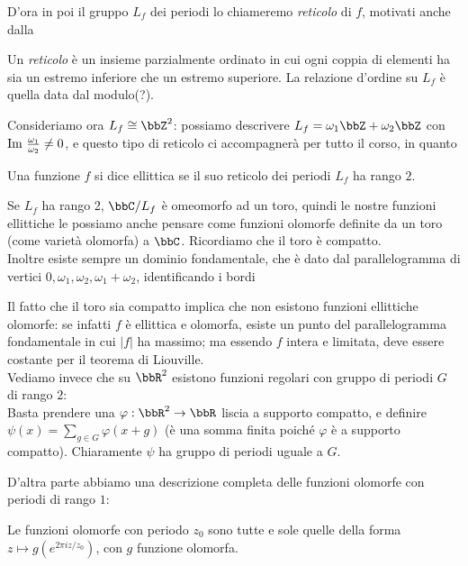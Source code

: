 D'ora in poi il gruppo $L_f$ dei periodi lo chiameremo \emph{reticolo} di $f$, motivati anche dalla
\begin{definizione}[Reticolo]
  Un \emph{reticolo} è un insieme parzialmente ordinato in cui ogni coppia di elementi ha sia un estremo inferiore che un estremo superiore. La relazione d'ordine su $L_f$ è quella data dal modulo(?).
\end{definizione}

Consideriamo ora $L_f \cong \bbZ^2$: possiamo descrivere $L_f = \omega_1 \bbZ + \omega_2 \bbZ$ con $\text{Im } \frac{\omega_1}{\omega_2} \neq 0$, e questo tipo di reticolo ci accompagnerà per tutto il corso, in quanto

\begin{definizione}
  Una funzione $f$ si dice ellittica se il suo reticolo dei periodi $L_f$ ha rango $2$.
\end{definizione}

\begin{osservazione}
  Se $L_f$ ha rango 2, $\bbC / L_f$ è omeomorfo ad un toro, quindi le nostre funzioni ellittiche le possiamo anche pensare come funzioni olomorfe definite da un toro (come varietà olomorfa) a $\bbC$. Ricordiamo che il toro è compatto.\\
  Inoltre esiste sempre un dominio fondamentale, che è dato dal parallelogramma di vertici $0,\omega_1,\omega_2,\omega_1+\omega_2$, identificando i bordi
\end{osservazione}

Il fatto che il toro sia compatto implica che non esistono funzioni ellittiche olomorfe: se infatti $f$ è ellittica e olomorfa, esiste un punto del parallelogramma fondamentale in cui $|f|$ ha massimo; ma essendo $f$ intera e limitata, deve essere costante per il teorema di Liouville.\\
Vediamo invece che su $\bbR^2$ esistono funzioni regolari con gruppo di periodi $G$ di rango $2$:
\\
Basta prendere una $\varphi:\bbR^2\to\bbR$ liscia a supporto compatto, e definire $\psi(x)=\sum_{g\in G}\varphi(x+g)$ (è una somma finita poiché $\varphi$ è a supporto compatto). Chiaramente $\psi$ ha gruppo di periodi uguale a $G$.

D'altra parte abbiamo una descrizione completa delle funzioni olomorfe con periodi di rango $1$:
\begin{esercizio}
  Le funzioni olomorfe con periodo $z_0$ sono tutte e sole quelle della
  forma $z \mapsto g(e^{2\pi i z/z_0})$, con $g$ funzione olomorfa.
\end{esercizio}

